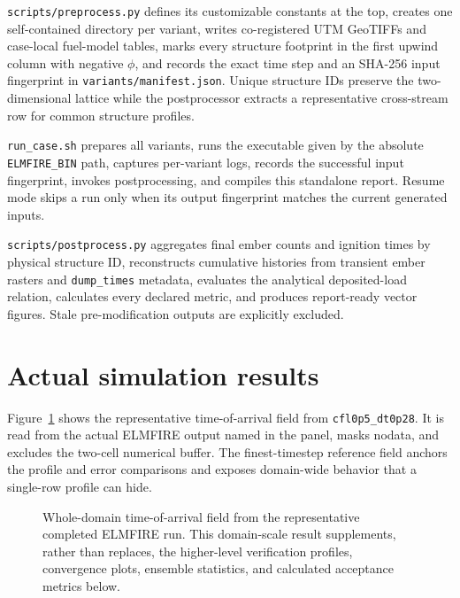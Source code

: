 \texttt{scripts/preprocess.py} defines its customizable constants at the top,
creates one self-contained directory per variant, writes co-registered UTM
GeoTIFFs and case-local fuel-model tables, marks every structure footprint in
the first upwind column with negative \(\phi\), and records the exact time step
and an SHA-256 input fingerprint in \texttt{variants/manifest.json}. Unique
structure IDs preserve the two-dimensional lattice while the postprocessor
extracts a representative cross-stream row for common structure profiles.

\texttt{run\_case.sh} prepares all variants, runs the executable given by the
absolute \texttt{ELMFIRE\_BIN} path, captures per-variant logs, records the
successful input fingerprint, invokes postprocessing, and compiles this
standalone report. Resume mode skips a run only when its output fingerprint
matches the current generated inputs.

\texttt{scripts/postprocess.py} aggregates final ember counts and ignition times
by physical structure ID, reconstructs cumulative histories from transient
ember rasters and \texttt{dump\_times} metadata, evaluates the analytical deposited-load relation,
calculates every declared metric, and produces report-ready vector figures.
Stale pre-modification outputs are explicitly excluded.

\section{Actual simulation results}

Figure~\ref{fig:domain-result} shows the representative time-of-arrival field from \texttt{cfl0p5\_dt0p28}.
It is read from the actual ELMFIRE output named in the panel, masks nodata, and excludes
the two-cell numerical buffer.  The finest-timestep reference field anchors the profile and error comparisons and exposes domain-wide behavior that a single-row profile can hide.

\begin{figure}[H]
\centering
{}
\caption{Whole-domain time-of-arrival field from the representative completed ELMFIRE run.  This
domain-scale result supplements, rather than replaces, the higher-level verification
profiles, convergence plots, ensemble statistics, and calculated acceptance metrics below.}
\label{fig:domain-result}
\end{figure}


